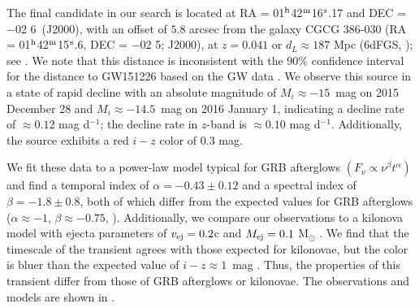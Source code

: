\clearpage
The final candidate in our search is located at RA = 01$^{\rm h}$42$^{\rm m}$16$^{\rm s}$.17 and DEC = $-$02 6\arcsec~(J2000), with an offset of $5.8$ arcsec from the galaxy CGCG 386-030 (RA =  01$^{\rm h}$42$^{\rm m}$15$^{\rm s}$.6, DEC = $-$02 5\arcsec; J2000), at $z = 0.041$ or $d_L \approx 187$ Mpc (6dFGS, \citealt{Jones+04,Jones+09}); see . We note that this distance is inconsistent with the 90\% confidence interval for the distance to GW151226 based on the GW data \citep{LIGOGW151226}. We observe this source in a state of rapid decline with an absolute magnitude of $M_i \approx -15$~mag on 2015 December 28 and $M_i\approx -14.5$~mag on 2016 January 1, indicating a decline rate of $\approx 0.12$ mag d$^{-1}$; the decline rate in $z$-band is $\approx 0.10$ mag d$^{-1}$. Additionally, the source exhibits a red $i-z$ color of $0.3$ mag.

We fit these data to a power-law model typical for GRB afterglows $(F_\nu \propto \nu^{\beta} t^{\alpha})$ and find a temporal index of $\alpha = -0.43\pm0.12$ and a spectral index of $\beta = -1.8\pm0.8$, both of which differ from the expected values for GRB afterglows ($\alpha \approx -1$, $\beta \approx -0.75$, \citealt{Sari+98}). Additionally, we compare our observations to a kilonova model with ejecta parameters of $v_{\rm ej} = 0.2$c and $M_{\rm ej} = 0.1$ M$_\odot$ \citep{BarnesKasen13}. We find that the timescale of the transient agrees with those expected for kilonovae, but the color is bluer than the expected value of $i-z \approx 1$~mag \citep{BarnesKasen13}. Thus, the properties of this transient differ from those of GRB afterglows or kilonovae. The observations and models are shown in .

